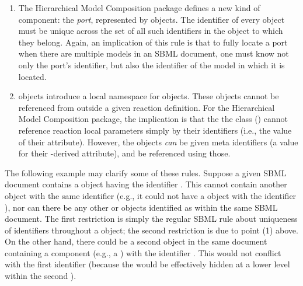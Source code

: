 \begin{enumerate}
\item The Hierarchical Model Composition package defines a new kind of
  component: the \emph{port}, represented by \Port objects.  The
  identifier of every \Port object must be unique across the set of all
  such identifiers in the \Model object to which they belong.  Again, an
  implication of this rule is that to fully locate a port when there are
  multiple models in an SBML document, one must know not only the port's
  identifier, but also the identifier of the model in which it is
  located.

\item \Reaction objects introduce a local namespace for \LocalParameter
  objects.  These objects cannot be referenced from outside a given
  reaction definition.  For the Hierarchical Model Composition package,
  the implication is that the the \SBaseRef class
  () cannot reference reaction local parameters
  simply by their identifiers (i.e., the value of their 
  attribute).  However, the \LocalParameter objects \emph{can} be given
  meta identifiers (a value for their \SBase-derived 
  attribute), and be referenced using those.

% 


\end{enumerate}

The following example may clarify some of these rules.  Suppose a given
SBML document contains a \Model object having the identifier .
This \Model cannot contain another object with the same identifier
(e.g., it could not have a \Parameter object with the identifier
), nor can there be any other \Model or
\ExternalModelDefinition objects identified as  within the
same SBML document.  The first restriction is simply the regular SBML
rule about uniqueness of identifiers throughout a \Model object; the
second restriction is due to point (1) above.  On the other hand, there
could be a second \Model object in the same document containing a
component (e.g., a \Parameter) with the identifier .  This
would not conflict with the first \Model identifier (because the
\Parameter would be effectively hidden at a lower level within the
second \Model).


